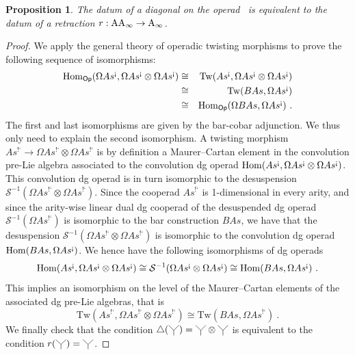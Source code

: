 \documentclass[twoside, 11pt]{amsart}
\newtheorem{proposition}[definition]{Proposition}
\theoremstyle{remark}
\begin{document}
\begin{proposition}
\label{prop:retract}
The datum of a diagonal on the operad \Ainf\ is equivalent to the datum of a retraction $r : \mathrm{AA}_\infty \rightarrow \mathrm{A}_\infty$.
\end{proposition}

\begin{proof}
We apply the general theory of operadic twisting morphisms \cite[Section 6.4]{LodayVallette12} to prove the following sequence of isomorphisms: 
\begin{eqnarray*}
  \mathrm{Hom}_{\mathsf{Op}} (\Omega As^{\text{!`}}, \Omega As^{\text{!`}} \otimes \Omega As^{\text{!`}}) & \cong & \mathrm{Tw}(As^{\text{!`}}, \Omega As^{\text{!`}} \otimes \Omega As^{\text{!`}}) \\
  & \cong & \mathrm{Tw}(B As,\Omega As^{\text{!`}}) \\
  & \cong & \mathrm{Hom}_{\mathsf{Op}} (\Omega B As, \Omega As^{\text{!`}}) \ . 
\end{eqnarray*}
The first and last isomorphisms are given by the bar-cobar adjunction. We thus only need to explain the second isomorphism. 
A twisting morphism $As^{\text{!`}}\to \Omega As^{\text{!`}} \otimes \Omega As^{\text{!`}}$ is by definition a Maurer--Cartan element in the convolution pre-Lie algebra associated to the convolution dg operad $\mathrm{Hom} (As^{\text{!`}}, \Omega As^{\text{!`}} \otimes \Omega As^{\text{!`}})$.
This convolution dg operad is in turn isomorphic to the desuspension $\mathcal{S}^{-1}(\Omega As^{\text{!`}} \otimes \Omega As^{\text{!`}})$.
Since the cooperad $As^{\text{!`}}$ is 1-dimensional in every arity, and since the arity-wise linear dual dg cooperad of the desuspended dg operad $\mathcal{S}^{-1}(\Omega As^{\text{!`}})$ is isomorphic to the bar construction $B As$, we have that 
the desuspension $\mathcal{S}^{-1}(\Omega As^{\text{!`}} \otimes \Omega As^{\text{!`}})$ is isomorphic to the convolution dg operad $\mathrm{Hom} (B As, \Omega As^{\text{!`}})$. 
We hence have the following isomorphisms of dg operads
\[ \mathrm{Hom} (As^{\text{!`}}, \Omega As^{\text{!`}} \otimes \Omega As^{\text{!`}}) \cong \mathcal{S}^{-1}(\Omega As^{\text{!`}} \otimes \Omega As^{\text{!`}}) \cong \mathrm{Hom} (B As, \Omega As^{\text{!`}}) \ . \]
This implies an isomorphism on the level of the Maurer--Cartan elements of the associated dg pre-Lie algebras, that is
\[ \mathrm{Tw}(As^{\text{!`}}, \Omega As^{\text{!`}} \otimes \Omega As^{\text{!`}}) \cong \mathrm{Tw}(B As,\Omega As^{\text{!`}}) \ . \]
We finally check that the condition $\triangle (\premiertermecobarbarA) = \premiertermecobarbarA \otimes \premiertermecobarbarA$ is equivalent to the condition $r(\premiertermecobarbarA)=\premiertermecobarbarA$.
\end{proof}
\end{document}

